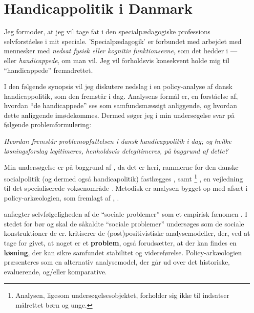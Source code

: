 \section{Handicappolitik i Danmark}

Jeg formoder, at jeg vil tage fat i den specialpædagogiske professions selvforståelse i mit speciale.
'Specialpædagogik' er forbundet med arbejdet med mennesker med \textit{nedsat fysisk eller kognitiv funktionsevne}, som det hedder i  — eller \textit{handicappede}, om man vil. Jeg vil forholdsvis konsekvent holde mig til “handicappede” fremadrettet.

I den følgende synopsis vil jeg diskutere nedslag i en policy-analyse af dansk handicappolitik, som den fremstår i dag.
Analysens formål er, en forståelse af, hvordan “de handicappede” ses som samfundsmæssigt anliggende, og hvordan dette anliggende imødekommes.
Dermed søger jeg i min undersøgelse svar på følgende problemformulering:
\begin{center}
  \textit{Hvordan fremstår problemopfattelsen i dansk handicappolitik i dag; og hvilke løsningsforslag legitimeres, henholdsvis delegitimeres, på baggrund af dette?}
\end{center}
Min undersøgelse er på baggrund af , da det er heri, rammerne for den danske socialpolitik (og dermed også handicapolitik) fastlægges \autocite[kapitel 2]{social-ogindenrigsministerietBekendtgorelseAfLov2019}, samt \footnote{Analysen, ligesom undersøgelsesobjektet, forholder sig ikke til indsatser målrettet børn og unge.}
, en vejledning til det specialiserede voksenområde \autocite{klStyringAfDet2017}.
Metodisk er analysen bygget op med afsæt i policy-arkæologien, som fremlagt af \citeauthor{scheurichPolicyArchaeologyNew1994}, \citeyear{scheurichPolicyArchaeologyNew1994}.

\citeauthor{scheurichPolicyArchaeologyNew1994}  anfægter selvfølgeligheden af de “sociale problemer” som et empirisk fænomen \autocite[s. ??]{scheurichPolicyArchaeologyNew1994}.
I stedet for bør og skal de såkaldte “sociale problemer” undersøges som de sociale konstruktioner de er.
\citeauthor{scheurichPolicyArchaeologyNew1994} kritiserer de (post)positivistiske analysemodeller, der, ved at tage for givet, at noget er et \textbf{problem}, også forudsætter, at der kan findes en \textbf{løsning}, der kan sikre samfundet stabilitet og videreførelse.
Policy-arkæologien præsenteres som en alternativ analysemodel, der går ud over det historiske, evaluerende, og/eller komparative.

